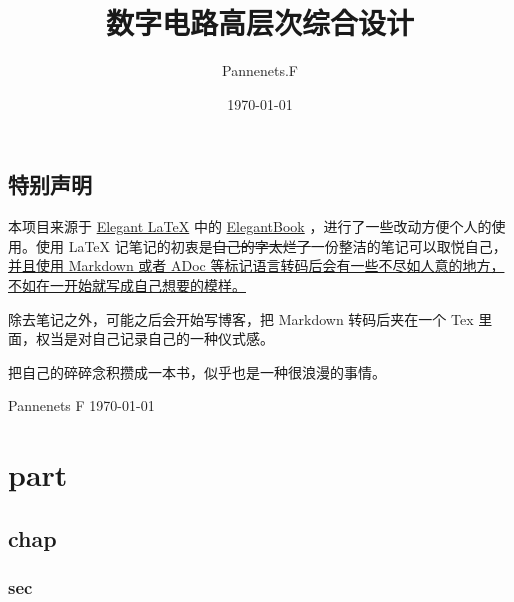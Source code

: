 \documentclass[cn,11pt,chinese,black,simple]{elegantbook}
\title{数字电路高层次综合设计}
\author{Pannenets.F}
\date{\today}
\begin{document}
\maketitle
\frontmatter

\chapter*{特别声明}

本项目来源于 \href{https://github.com/ElegantLaTeX}{Elegant \LaTeX{}} 中的 \href{https://github.com/ElegantLaTeX/ElegantBook}{ElegantBook} ，进行了一些改动方便个人的使用。使用 \LaTeX{} 记笔记的初衷是\sout{自己的字太烂了}一份整洁的笔记可以取悦自己，\uline{并且使用 Markdown 或者 ADoc 等标记语言转码后会有一些不尽如人意的地方，不如在一开始就写成自己想要的模样。}

除去笔记之外，可能之后会开始写博客，把 Markdown 转码后夹在一个 Tex 里面，权当是对自己记录自己的一种仪式感。

\begin{center}
  把自己的碎碎念积攒成一本书，似乎也是一种很浪漫的事情。
\end{center}

\vskip 1.5cm


\begin{flushright}
Pannenets F
\today
\end{flushright}

\tableofcontents

\mainmatter

\part{part}

\chapter{chap}

\section{sec}
\end{document}
